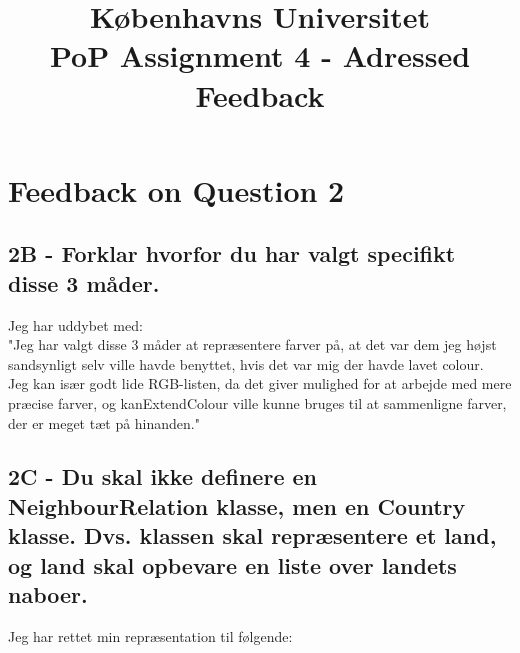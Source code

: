 \documentclass[a4paper,12pt]{article}
\begin{document}
% 

\title{Københavns Universitet\\ 
PoP Assignment 4 - Adressed Feedback}
\maketitle %

\section{Feedback on Question 2}

\subsection*{2B - Forklar hvorfor du har valgt specifikt disse 3 måder.}
Jeg har uddybet med:\\
"Jeg har valgt disse 3 måder at repræsentere farver på, at det var dem jeg højst sandsynligt selv ville havde benyttet, hvis det var mig der havde lavet colour.\\
Jeg kan især godt lide RGB-listen, da det giver mulighed for at arbejde med mere præcise farver, og kanExtendColour ville kunne bruges til at sammenligne farver, der er meget tæt på hinanden."


\subsection*{2C - Du skal ikke definere en NeighbourRelation klasse, men en Country klasse. Dvs. klassen skal repræsentere et land, og land skal opbevare en liste over landets naboer.}
Jeg har rettet min repræsentation til følgende:
\end{document}
